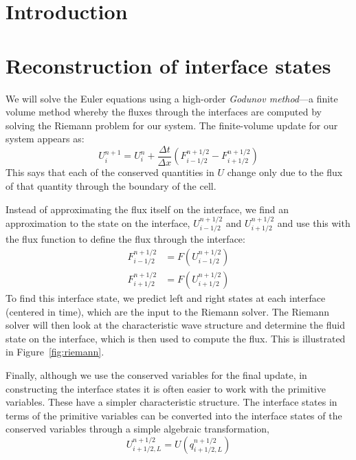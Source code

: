 \label{ch:compressible}

\section{Introduction}

\label{sec:eulermeth:intro}



\section{Reconstruction of interface states}

\label{sec:onedrecon}

We will solve the Euler equations using a high-order {\em Godunov
  method}---a finite volume method whereby the fluxes through the
interfaces are computed by solving the Riemann problem for our system.
The finite-volume update for our system appears as:
\begin{equation}
U^{n+1}_i = U^n_i + \frac{\Delta t}{\Delta x} \left ( F_{i-1/2}^{n+1/2} - F_{i+1/2}^{n+1/2} \right )
\end{equation}
This says that each of the conserved quantities in $U$ change only due
to the flux of that quantity through the boundary of the cell.

Instead of approximating the flux itself on the interface, we find an
approximation to the state on the interface, $U_{i-1/2}^{n+1/2}$ and
$U_{i+1/2}^{n+1/2}$ and use this with the flux function to define the
flux through the interface:
\begin{align}
F_{i-1/2}^{n+1/2} &= F(U_{i-1/2}^{n+1/2}) \\
F_{i+1/2}^{n+1/2} &= F(U_{i+1/2}^{n+1/2})
\end{align}
To find this interface state, we predict left and right states at each
interface (centered in time), which are the input to the Riemann
solver.  The Riemann solver will then look at the characteristic wave
structure and determine the fluid state on the interface, which is
then used to compute the flux.  This is illustrated in
Figure~\ref{fig:riemann}.

Finally, although we use the conserved variables for the final update,
in constructing the interface states it is often easier to work with
the primitive variables.  These have a simpler characteristic
structure.  The interface states in terms of the primitive variables
can be converted into the interface states of the conserved variables
through a simple algebraic transformation,
\begin{equation}
U_{i+1/2,L}^{n+1/2} = U(q_{i+1/2,L}^{n+1/2})
\end{equation}

